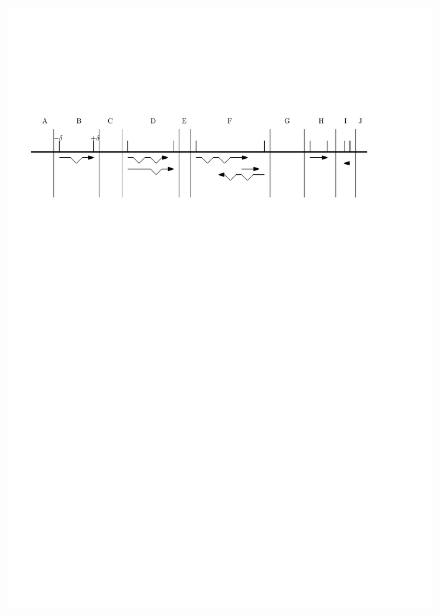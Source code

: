\begin{figure}[!bht]
\includegraphics[width=6in]{Assets/Graphics/iLoci/ilocus-demo.pdf}
\centering
\caption{~}
\label{Fig:iLoci}
\end{figure}



